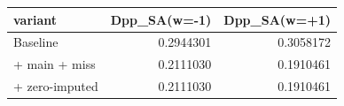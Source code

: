 
\begin{tabular}[t]{lrr}
\toprule
variant & Dpp\_SA(w=-1) & Dpp\_SA(w=+1)\\
\midrule
Baseline & 0.2944301 & 0.3058172\\
+ main + miss & 0.2111030 & 0.1910461\\
+ zero-imputed & 0.2111030 & 0.1910461\\
\bottomrule
\end{tabular}
